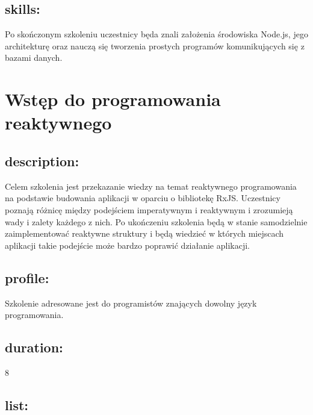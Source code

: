 \documentclass{article}[10pt]
\begin{document}
	\subsection*{skills:}
\begin{adjustwidth}{2cm}{}
	
Po skończonym szkoleniu uczestnicy będa znali założenia środowiska Node.js, jego architekturę oraz nauczą się tworzenia prostych programów komunikujących się z bazami danych.

\end{adjustwidth}

\newpage


    
	\section{Wstęp do programowania reaktywnego}

	\subsection*{description:}
	\begin{adjustwidth}{2cm}{}
		
Celem szkolenia jest przekazanie wiedzy na temat reaktywnego programowania na podstawie budowania aplikacji w oparciu o bibliotekę RxJS. Uczestnicy poznają różnicę między podejściem imperatywnym i reaktywnym i zrozumieją wady i zalety każdego z nich. Po ukończeniu szkolenia będą w stanie samodzielnie zaimplementować reaktywne struktury i będą wiedzieć w których miejscach aplikacji takie podejście może bardzo poprawić działanie aplikacji.

	\end{adjustwidth}
	\subsection*{profile:}
\begin{adjustwidth}{2cm}{}
	
Szkolenie adresowane jest do programistów znających dowolny język programowania.
\end{adjustwidth}
	\subsection*{duration:}
\begin{adjustwidth}{2cm}{}
	8
\end{adjustwidth}

	\subsection*{list:}
\begin{adjustwidth}{1.5cm}{}
	\begin{itemize}










	\end{itemize}
\end{adjustwidth}
\end{document}
